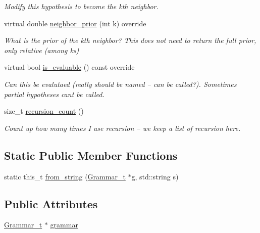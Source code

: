 \begin{DoxyCompactItemize}
\begin{DoxyCompactList}\small\item\em Modify this hypothesis to become the k\textquotesingle{}th neighbor. \end{DoxyCompactList}\item 
virtual double \hyperlink{class_l_o_t_hypothesis_a7c0e1a289a9166e4d2470f2e700a475d}{neighbor\+\_\+prior} (int k) override
\begin{DoxyCompactList}\small\item\em What is the prior of the k\textquotesingle{}th neighbor? This does not need to return the full prior, only relative (among ks) \end{DoxyCompactList}\item 
virtual bool \hyperlink{class_l_o_t_hypothesis_ac5d6d329147999aee0e37b51c6529385}{is\+\_\+evaluable} () const override
\begin{DoxyCompactList}\small\item\em Can this be evalutaed (really should be named -- can be called?). Sometimes partial hypotheses can\textquotesingle{}t be called. \end{DoxyCompactList}\item 
size\+\_\+t \hyperlink{class_l_o_t_hypothesis_a87050731f95b5451fd7ae37adffded4a}{recursion\+\_\+count} ()
\begin{DoxyCompactList}\small\item\em Count up how many times I use recursion -- we keep a list of recursion here. \end{DoxyCompactList}\end{DoxyCompactItemize}
\subsection*{Static Public Member Functions}
\begin{DoxyCompactItemize}
\item 
static this\+\_\+t \hyperlink{class_l_o_t_hypothesis_aa8501ac78dcf74e212104095f54ffe21}{from\+\_\+string} (\hyperlink{class_l_o_t_hypothesis_a5393058e614835e0f139bd40acb183b2}{Grammar\+\_\+t} $\ast$g, std\+::string s)
\end{DoxyCompactItemize}
\subsection*{Public Attributes}
\begin{DoxyCompactItemize}
\item 
\hyperlink{class_l_o_t_hypothesis_a5393058e614835e0f139bd40acb183b2}{Grammar\+\_\+t} $\ast$ \hyperlink{class_l_o_t_hypothesis_af61940657fe62dd86e21077cc64aca2f}{grammar}
\end{DoxyCompactItemize}
